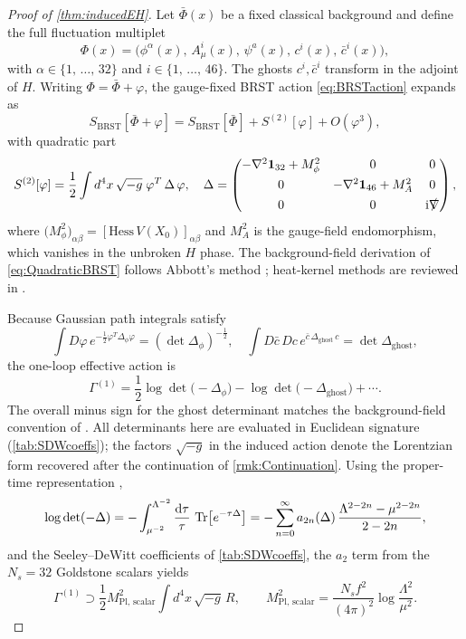 \documentclass[pdflatex,sn-mathphys-num]{sn-jnl}
\theoremstyle{thmstyleone}
\theoremstyle{thmstylethree}%
\theoremstyle{thmstyletwo}%
\begin{document}
\begin{appendices}
\begin{proof}[Proof of \autoref{thm:inducedEH}]
Let \(\bar\Phi(x)\) be a fixed classical background and define the full
fluctuation multiplet
\[
  \Phi(x)=\bigl(\phi^{\alpha}(x),\,
                A_{\mu}^{i}(x),\,
                \psi^{a}(x),\,
                c^{i}(x),\,
                \bar c^{i}(x)\bigr),
\]
with
\(
  \alpha\in \{1,\,\dots,\,32\}
\)
and
\(
  i\in\{1,\,\dots,\,46\}
\).
The ghosts \(c^{i},\bar c^{i}\) transform in the adjoint of
\(H\). Writing \(\Phi=\bar\Phi+\varphi\), the gauge-fixed BRST action
\eqref{eq:BRSTaction} expands as
\[
  S_{\mathrm{BRST}}[\bar\Phi+\varphi]
  = S_{\mathrm{BRST}}[\bar\Phi]
    +S^{(2)}[\varphi]
    +O(\varphi^{3}),
\]
with quadratic part
\begin{equation}\label{eq:QuadraticBRST}
  S^{(2)}[\varphi]
  = \frac12\int d^{4}x\,\sqrt{-g}\;
    \varphi^{T}\,\Delta\,\varphi,
  \quad
  \Delta=
  \begin{pmatrix}
    -\nabla^{2}\mathbf1_{32}+M_{\phi}^{2} & 0 & 0 \\[4pt]
    0 & -\nabla^{2}\mathbf1_{46}+M_{A}^{2} & 0 \\[4pt]
    0 & 0 & \mathrm i\slashed\nabla
  \end{pmatrix},
\end{equation}
where \(\bigl(M_{\phi}^{2}\bigr)_{\alpha\beta}
       =[\mathrm{Hess}\,V(X_{0})]_{\alpha\beta}\) and
\(M_{A}^{2}\) is the gauge-field endomorphism, which vanishes in
the unbroken \(H\) phase.  The background-field derivation of
\eqref{eq:QuadraticBRST} follows Abbott's method \cite{Abbott:1981ke};
heat-kernel methods are reviewed in \cite{Vassilevich:2003xt}.

Because Gaussian path integrals satisfy \cite{Peskin:1995ev,Abbott:1981ke}
\[
  \int D\varphi\,e^{-\tfrac12\varphi^{T}\Delta_{\phi}\varphi}
  =(\det\Delta_{\phi})^{-\tfrac12},
  \quad
  \int D\bar c\,Dc\,e^{\bar c\,\Delta_{\text{ghost}}\,c}
  =\det\Delta_{\text{ghost}},
\]
the one-loop effective action is
\[
  \Gamma^{(1)}
  = \frac12\log\det\bigl(-\Delta_{\phi}\bigr)
    - \log\det\bigl(-\Delta_{\text{ghost}}\bigr)
    + \cdots.
\]
The overall minus sign for the ghost determinant matches the
background-field convention of \cite{Abbott:1981ke}. All determinants here are
evaluated in Euclidean signature (\autoref{tab:SDWcoeffs}); the factors
$\sqrt{-g}$ in the induced action denote the Lorentzian form recovered after the
continuation of \autoref{rmk:Continuation}. Using the proper-time representation
\cite{Hawking:1977},
\[
  \log\det(-\Delta)
  = -\int_{\mu^{-2}}^{\Lambda^{-2}}
      \frac{\mathrm d\tau}{\tau}\,
      \operatorname{Tr} \bigl[e^{-\tau\Delta}\bigr]
  = -\sum_{n=0}^{\infty}
      a_{2n}(\Delta)\,
      \frac{\Lambda^{2-2n}-\mu^{2-2n}}{2-2n},
\]
and the Seeley--DeWitt coefficients of
\autoref{tab:SDWcoeffs}, the \(a_{2}\) term from the
\(N_{s}=32\) Goldstone scalars yields
\[
  \Gamma^{(1)}
  \supset
  \frac12 M_{\mathrm{Pl},\,\mathrm{scalar}}^{2}
  \int d^{4}x\,\sqrt{-g}\,R,
\qquad
  M_{\mathrm{Pl},\,\mathrm{scalar}}^{2}
  =\frac{N_{s}f^{2}}{(4\pi)^{2}}
   \log \frac{\Lambda^{2}}{\mu^{2}}.
\]
\end{proof}



\end{appendices}
\end{document}
